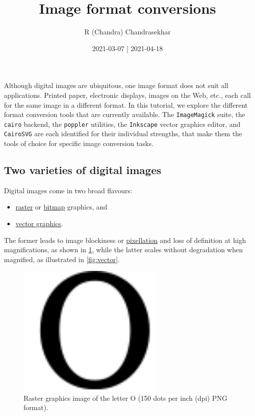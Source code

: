 \documentclass[
  a4paper,
]{article}
\title{Image format conversions}
\author{R (Chandra) Chandrasekhar}
\date{2021-03-07 | 2021-04-18}
\providecommand{\tightlist}{%
  \setlength{\itemsep}{0pt}\setlength{\parskip}{0pt}}
\begin{document}
\maketitle

\thispagestyle{empty}


Although digital images are ubiquitous, one image format does not suit
all applications. Printed paper, electronic displays, images on the Web,
etc., each call for the same image in a different format. In this
tutorial, we explore the different format conversion tools that are
currently available. The \texttt{ImageMagick} suite, the \texttt{cairo}
backend, the \texttt{poppler} utilities, the \texttt{Inkscape} vector
graphics editor, and \texttt{CairoSVG} are each identified for their
individual strengths, that make them the tools of choice for specific
image conversion tasks.

\hypertarget{two-varieties-of-digital-images}{%
\subsection{Two varieties of digital
images}\label{two-varieties-of-digital-images}}

Digital images come in two broad flavours:

\begin{itemize}
\tightlist
\item
  \href{https://en.wikipedia.org/wiki/Raster_graphics}{raster} or
  \href{https://en.wikipedia.org/wiki/Bitmap}{bitmap} graphics, and
\item
  \href{https://en.wikipedia.org/wiki/Vector_graphics}{vector graphics}.
\end{itemize}

The former leads to image blockiness or
\href{https://en.wikipedia.org/wiki/Pixelation}{pixellation} and loss of
definition at high magnifications, as shown in \cref{fig:raster}, while
the latter scales without degradation when magnified, as illustrated in
\cref{fig:vector}.

\begin{figure}
\hypertarget{fig:raster}{%
\centering
\includegraphics[width=0.64\textwidth,height=\textheight]{images/letter-O-150-dpi.png}
\caption{Raster graphics image of the letter O (150 dots per inch (dpi)
PNG format).}\label{fig:raster}
}
\end{figure}
\end{document}
